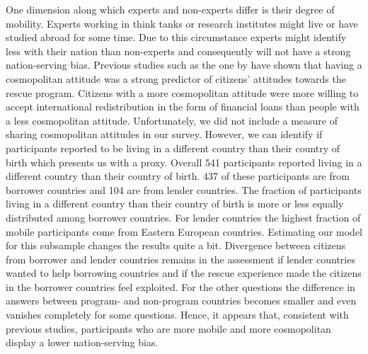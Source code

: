 One dimension along which experts and non-experts differ is their degree of mobility. Experts working in think tanks or research institutes might live or have studied abroad for some time. Due to this circumstance experts might identify less with their nation than non-experts and consequently will not have a strong nation-serving bias. Previous studies such as the one by \cite{bechtel} have shown that having a cosmopolitan attitude was a strong predictor of citizens' attitudes towards the rescue program. Citizens with a more cosmopolitan attitude were more willing to accept international redistribution in the form of financial loans than people with a less cosmopolitan attitude. Unfortunately, we did not include a measure of sharing cosmopolitan attitudes in our survey. However, we can identify if participants reported to be living in a different country than their country of birth which presents us with a proxy. Overall 541 participants reported living in a different country than their country of birth. 437 of these participants are from borrower countries and 104 are from lender countries. The fraction of participants living in a different country than their country of birth is more or less equally distributed among borrower countries. For lender countries the highest fraction of mobile participants come from Eastern European countries. Estimating our model for this subsample changes the results quite a bit. Divergence between citizens from borrower and lender countries remains in the assessment if lender countries wanted to help borrowing countries and if the rescue experience made the citizens in the borrower countries feel exploited. For the other questions the difference in answers between program- and non-program countries becomes smaller and even vanishes completely for some questions. Hence, it appears that, consistent with previous studies, participants who are more mobile and more cosmopolitan display a lower nation-serving bias.  \\

